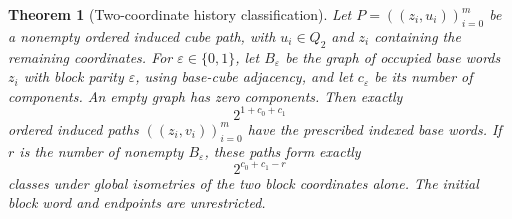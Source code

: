 \documentclass[11pt,a4paper]{article}
\newtheorem{theorem}{Theorem}[section]
\theoremstyle{definition}
\theoremstyle{remark}
\begin{document}
\begin{theorem}[Two-coordinate history classification]
\label{thm:history205}
Let $P=((z_i,u_i))_{i=0}^{m}$ be a nonempty ordered induced cube
path, with $u_i\in Q_2$ and $z_i$ containing the remaining coordinates.
For $\varepsilon\in\{0,1\}$, let $B_\varepsilon$ be the graph of
occupied base words $z_i$ with block parity $\varepsilon$, using
base-cube adjacency, and let $c_\varepsilon$ be its number of
components. An empty graph has zero components. Then exactly
\[
2^{1+c_0+c_1}
\]
ordered induced paths $((z_i,v_i))_{i=0}^{m}$ have the prescribed
indexed base words. If $r$ is the number of nonempty $B_\varepsilon$,
these paths form exactly
\[
2^{c_0+c_1-r}
\]
classes under global isometries of the two block coordinates alone.
The initial block word and endpoints are unrestricted.
\end{theorem}
\end{document}

